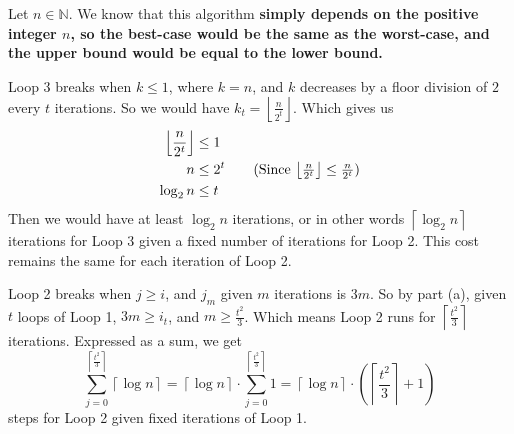 \documentclass{article}
\begin{document}
\begin{enumerate}
\begin{enumerate}[label=(\alph*)]
                Let $n \in \mathbb{N}$. We know that this algorithm
                \textbf{simply depends on the positive integer $n$, so 
                the best-case would be the same as the worst-case, and the 
                upper bound would be equal to the lower bound.}

                Loop 3 breaks when $k \leq 1$, where $k = n$, and $k$ decreases 
                by a floor division of $2$ every $t$ iterations. So we would 
                have $k_t = \left\lfloor \frac{n}{2^t} \right\rfloor$. Which 
                gives us 
                \begin{align*}
                    \left\lfloor \frac{n}{2^t} \right\rfloor &\leq 1 \\
                    n &\leq 2^t \tag*{(Since 
                    $\left\lfloor \frac{n}{2^t}\right\rfloor \leq \frac{n}{2^t}$)}\\
                    \log_2 n  &\leq t  
                \end{align*}
                Then we would have at least $\log_2 n$ iterations, or 
                in other words $\left\lceil \log_2 n \right\rceil $ 
                iterations for Loop 3 given a fixed number of iterations 
                for Loop 2. This cost remains the same for each iteration of 
                Loop 2.

                Loop 2 breaks when $j \geq i$, and $j_m$ given $m$ iterations 
                is $3m$. So by part (a), given $t$ loops of Loop 1, 
                $3m \geq i_t$, and $m \geq \frac{t^2}{3}$. Which means 
                Loop 2 runs for $\left\lceil \frac{t^2}{3} \right\rceil $ iterations. 
                Expressed as a sum, we get 
                $$ \sum_{j = 0}^{\left\lceil \frac{t^2}{3} \right\rceil } \left\lceil 
                \log n \right\rceil = \left\lceil \log n \right\rceil
                \cdot \sum_{j=0}^{\left\lceil \frac{t^2}{3} \right\rceil } 1 
                = \left\lceil \log n \right\rceil \cdot \left(\left\lceil 
                \frac{t^2}{3}\right\rceil + 1\right) $$
                steps for Loop 2 given fixed iterations of Loop 1. 


\end{enumerate}
\end{enumerate}
\end{document}
